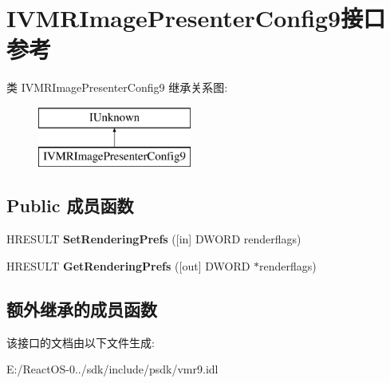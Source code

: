 \hypertarget{interface_i_v_m_r_image_presenter_config9}{}\section{I\+V\+M\+R\+Image\+Presenter\+Config9接口 参考}
\label{interface_i_v_m_r_image_presenter_config9}
类 I\+V\+M\+R\+Image\+Presenter\+Config9 继承关系图\+:\begin{figure}[H]
\begin{center}
\leavevmode
\includegraphics[height=2.000000cm]{interface_i_v_m_r_image_presenter_config9}
\end{center}
\end{figure}
\subsection*{Public 成员函数}
\begin{DoxyCompactItemize}
\item 
\mbox{\label{interface_i_v_m_r_image_presenter_config9_a36e2a438b6a915bfb042137b90634867}} 
H\+R\+E\+S\+U\+LT {\bfseries Set\+Rendering\+Prefs} (\mbox{[}in\mbox{]} D\+W\+O\+RD renderflags)
\item 
\mbox{\label{interface_i_v_m_r_image_presenter_config9_a6725f4b5ec9072cc1c3ef7af45207cdb}} 
H\+R\+E\+S\+U\+LT {\bfseries Get\+Rendering\+Prefs} (\mbox{[}out\mbox{]} D\+W\+O\+RD $\ast$renderflags)
\end{DoxyCompactItemize}
\subsection*{额外继承的成员函数}


该接口的文档由以下文件生成\+:\begin{DoxyCompactItemize}
\item 
E\+:/\+React\+O\+S-\/0../sdk/include/psdk/vmr9.\+idl\end{DoxyCompactItemize}
